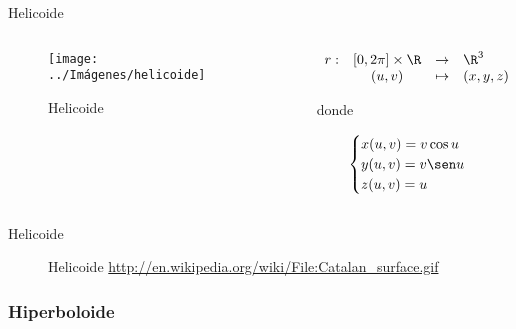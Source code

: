 \documentclass[10pt]{beamer}
\begin{document}
	\begin{frame}{Helicoide}
		\begin{columns}[t] %
			\begin{column}{.50\textwidth}
				\begin{figure}
					\centering
					\texttt{[image: ../Imágenes/helicoide]}
					\caption{Helicoide}
					\label{fig:helicoide}
				\end{figure}
			\end{column}%
			\hfill%
			\begin{column}{.50\textwidth}
				$$\begin{array}{rcll}
				r : & [0, 2\pi] \times \R & \to & \R^3\\
				& (u,v) & \mapsto & (x,y,z)
				\end{array}$$
				
				donde 
				
				$$ \begin{cases}
				x(u,v) = v\cos u \\
				y(u,v) = v\sen u \\
				z(u,v) = u
				\end{cases} $$
			\end{column}%
		\end{columns}
	\end{frame}
	
	\begin{frame}{Helicoide}
	\begin{figure}
		\centering
		\caption{Helicoide \url{http://en.wikipedia.org/wiki/File:Catalan_surface.gif}}
		\label{fig:helicoide-gif}
	\end{figure}
		
	\end{frame}
	
	\subsubsection{Hiperboloide}
	
\end{document}
